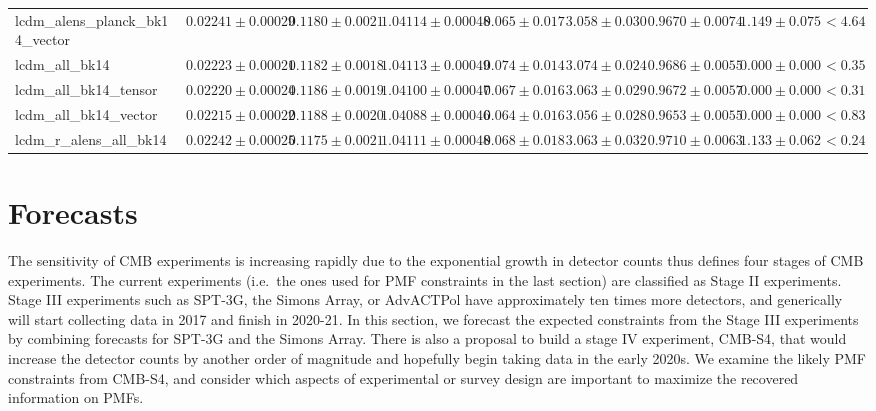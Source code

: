 \documentclass[preprint]{emulateapj}
\begin{document}
\begin{table}[h]
\begin{center}
\begin{tabular}{l || c c c c c c c | c}
lcdm\_alens\_planck\_bk14\_vector & $ 0.02241\pm  0.00029$ & $ 0.1180\pm  0.0021$ & $ 1.04114\pm  0.00048$ & $ 0.065\pm  0.017$ & $ 3.058\pm  0.030$ & $ 0.9670\pm  0.0074$ & $ 1.149 \pm  0.075$ & $< 4.64$ \\
lcdm\_all\_bk14 & $ 0.02223\pm  0.00021$ & $ 0.1182\pm  0.0018$ & $ 1.04113\pm  0.00049$ & $ 0.074\pm  0.014$ & $ 3.074\pm  0.024$ & $ 0.9686\pm  0.0055$ & $ 0.000 \pm  0.000$ & $< 0.35$ \\
lcdm\_all\_bk14\_tensor & $ 0.02220\pm  0.00024$ & $ 0.1186\pm  0.0019$ & $ 1.04100\pm  0.00047$ & $ 0.067\pm  0.016$ & $ 3.063\pm  0.029$ & $ 0.9672\pm  0.0057$ & $ 0.000 \pm  0.000$ & $< 0.31$ \\
lcdm\_all\_bk14\_vector & $ 0.02215\pm  0.00022$ & $ 0.1188\pm  0.0020$ & $ 1.04088\pm  0.00046$ & $ 0.064\pm  0.016$ & $ 3.056\pm  0.028$ & $ 0.9653\pm  0.0055$ & $ 0.000 \pm  0.000$ & $< 0.83$ \\
lcdm\_r\_alens\_all\_bk14 & $ 0.02242\pm  0.00025$ & $ 0.1175\pm  0.0021$ & $ 1.04111\pm  0.00048$ & $ 0.068\pm  0.018$ & $ 3.063\pm  0.032$ & $ 0.9710\pm  0.0063$ & $ 1.133 \pm  0.062$ & $< 0.24$ \\
\end{tabular}
 \normalsize
\end{center}
\end{table}


\section{Forecasts}
\label{sec:forecasts}

The sensitivity of CMB experiments is increasing rapidly due to the exponential growth in detector counts
\citet{s4sciencebook} thus defines four stages of CMB experiments. 
The current experiments (i.e.~the ones used for PMF constraints in the last section) are classified as Stage II experiments. 
Stage III experiments such as SPT-3G, the Simons Array, or AdvACTPol \citep{spt3g,simonsarray,advactpol} have approximately ten times more detectors, and generically will start collecting data in 2017 and finish in 2020-21.
In this section, we forecast the expected constraints from the Stage III experiments by combining forecasts for SPT-3G and the Simons Array. 
There is also a proposal to build a stage IV experiment, CMB-S4,  that would increase the detector counts by another order of magnitude and hopefully begin taking data in the early 2020s.
We examine the likely PMF constraints from CMB-S4, and consider which aspects of experimental or survey design are important to maximize the recovered information on PMFs.
\end{document}
